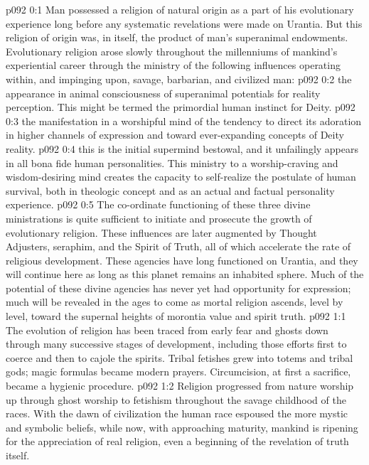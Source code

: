 \author{Melchizedek}
\vs p092 0:1 Man possessed a religion of natural origin as a part of his evolutionary experience long before any systematic revelations were made on Urantia. But this religion of  origin was, in itself, the product of man’s superanimal endowments. Evolutionary religion arose slowly throughout the millenniums of mankind’s experiential career through the ministry of the following influences operating within, and impinging upon, savage, barbarian, and civilized man:
\vs p092 0:2 \bibnobreakspace {} the appearance in animal consciousness of superanimal potentials for reality perception. This might be termed the primordial human instinct for Deity.
\vs p092 0:3 \bibnobreakspace {} the manifestation in a worshipful mind of the tendency to direct its adoration in higher channels of expression and toward ever\hyp{}expanding concepts of Deity reality.
\vs p092 0:4 \bibnobreakspace {} this is the initial supermind bestowal, and it unfailingly appears in all bona fide human personalities. This ministry to a worship\hyp{}craving and wisdom\hyp{}desiring mind creates the capacity to self\hyp{}realize the postulate of human survival, both in theologic concept and as an actual and factual personality experience.
\vs p092 0:5 \pc The co\hyp{}ordinate functioning of these three divine ministrations is quite sufficient to initiate and prosecute the growth of evolutionary religion. These influences are later augmented by Thought Adjusters, seraphim, and the Spirit of Truth, all of which accelerate the rate of religious development. These agencies have long functioned on Urantia, and they will continue here as long as this planet remains an inhabited sphere. Much of the potential of these divine agencies has never yet had opportunity for expression; much will be revealed in the ages to come as mortal religion ascends, level by level, toward the supernal heights of morontia value and spirit truth.
\vs p092 1:1 The evolution of religion has been traced from early fear and ghosts down through many successive stages of development, including those efforts first to coerce and then to cajole the spirits. Tribal fetishes grew into totems and tribal gods; magic formulas became modern prayers. Circumcision, at first a sacrifice, became a hygienic procedure.
\vs p092 1:2 Religion progressed from nature worship up through ghost worship to fetishism throughout the savage childhood of the races. With the dawn of civilization the human race espoused the more mystic and symbolic beliefs, while now, with approaching maturity, mankind is ripening for the appreciation of real religion, even a beginning of the revelation of truth itself.
